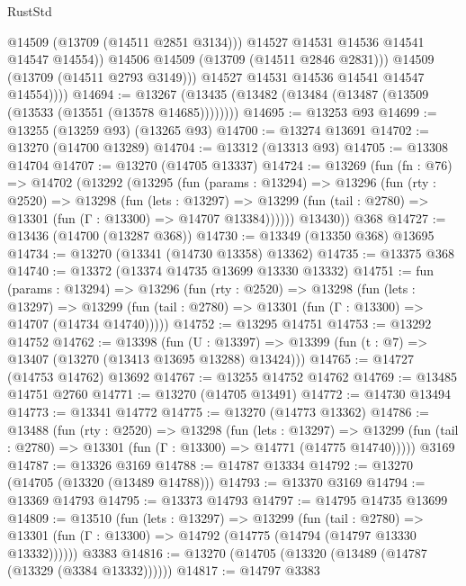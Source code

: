 \begin{lexlean}{RustStd}
\begin{coremodule}
                      @14509
                      (@13709 (@14511 @2851 @3134)))
                    @14527
                    @14531
                    @14536
                    @14541
                    @14547
                    @14554))
                @14506
                @14509
                (@13709 (@14511 @2846 @2831)))
              @14509
              (@13709 (@14511 @2793 @3149)))
            @14527
            @14531
            @14536
            @14541
            @14547
            @14554))))
@14694 := @13267 (@13435 (@13482 (@13484 (@13487 (@13509 (@13533 (@13551 (@13578 @14685))))))))
@14695 := @13253 @93
@14699 := @13255 (@13259 @93) (@13265 @93)
@14700 := @13274 @13691
@14702 := @13270 (@14700 @13289)
@14704 := @13312 (@13313 @93)
@14705 := @13308 @14704
@14707 := @13270 (@14705 @13337)
@14724 := @13269
    (fun (fn : @76) =>
    @14702
      (@13292
        (@13295
          (fun (params : @13294) =>
          @13296
            (fun (rty : @2520) =>
            @13298
              (fun (lets : @13297) =>
              @13299 (fun (tail : @2780) => @13301 (fun (Γ : @13300) => @14707 @13384))))))
        @13430))
    @368
@14727 := @13436 (@14700 (@13287 @368))
@14730 := @13349 (@13350 @368) @13695
@14734 := @13270 (@13341 (@14730 @13358) @13362)
@14735 := @13375 @368
@14740 := @13372 (@13374 @14735 @13699 @13330 @13332)
@14751 := fun (params : @13294) =>
  @13296
    (fun (rty : @2520) =>
    @13298
      (fun (lets : @13297) =>
      @13299 (fun (tail : @2780) => @13301 (fun (Γ : @13300) => @14707 (@14734 @14740)))))
@14752 := @13295 @14751
@14753 := @13292 @14752
@14762 := @13398
    (fun (U : @13397) => @13399 (fun (t : @7) => @13407 (@13270 (@13413 @13695 @13288) @13424)))
@14765 := @14727 (@14753 @14762) @13692
@14767 := @13255 @14752 @14762
@14769 := @13485 @14751 @2760
@14771 := @13270 (@14705 @13491)
@14772 := @14730 @13494
@14773 := @13341 @14772
@14775 := @13270 (@14773 @13362)
@14786 := @13488
    (fun (rty : @2520) =>
    @13298
      (fun (lets : @13297) =>
      @13299 (fun (tail : @2780) => @13301 (fun (Γ : @13300) => @14771 (@14775 @14740)))))
    @3169
@14787 := @13326 @3169
@14788 := @14787 @13334
@14792 := @13270 (@14705 (@13320 (@13489 @14788)))
@14793 := @13370 @3169
@14794 := @13369 @14793
@14795 := @13373 @14793
@14797 := @14795 @14735 @13699
@14809 := @13510
    (fun (lets : @13297) =>
    @13299
      (fun (tail : @2780) =>
      @13301 (fun (Γ : @13300) => @14792 (@14775 (@14794 (@14797 @13330 @13332))))))
    @3383
@14816 := @13270 (@14705 (@13320 (@13489 (@14787 (@13329 (@3384 @13332))))))
@14817 := @14797 @3383

\end{coremodule}
\end{lexlean}
